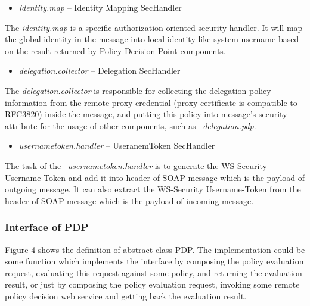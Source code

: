 \documentclass[a4paper]{article}
\newcommand\liststyleWWviiiNumxiii{%
\renewcommand\labelitemi{[F0B7?]}
\renewcommand\labelitemii{[F0B7?]}
\renewcommand\labelitemiii{[F0B7?]}
\renewcommand\labelitemiv{[F0B7?]}
}
\newcounter{Figure}
\begin{document}
\liststyleWWviiiNumxiii
\begin{itemize}
\item {\color{black}
\textit{identity.map} -- Identity Mapping SecHandler}
\end{itemize}
{\upshape\color{black}
The \textit{identity.map} is a specific authorization oriented security
handler. It will map the global identity in the message into local
identity like system username based on the result returned by Policy
Decision Point components.}

\liststyleWWviiiNumxiii
\begin{itemize}
\item {\color{black}
\textit{delegation.collector} -- Delegation SecHandler}
\end{itemize}
{\upshape\color{black}
The \textit{delegation.collector} is responsible for collecting the
delegation policy information from the remote proxy credential (proxy
certificate is compatible to RFC3820) inside the message, and putting
this policy into message{\textquoteright}s security attribute for the
usage of other components, such as \ \textit{delegation.pdp}.}

\liststyleWWviiiNumxiii
\begin{itemize}
\item {\color{black}
\textit{usernametoken.handler} -- UseranemToken SecHandler}
\end{itemize}
{\upshape\color{black}
The task of the \ \textit{usernametoken.handler} is to generate the
WS-Security Username-Token and add it into header of SOAP message which
is the payload of outgoing message. It can also extract the WS-Security
Username-Token from the header of SOAP message which is the payload of
incoming message.}

\subsubsection[Interface of PDP]{Interface of PDP}
\label{bkm:Ref204009855}{\upshape\color{black}
Figure 4 shows the definition of abstract class PDP. The implementation
could be some function which implements the interface by composing the
policy evaluation request, evaluating this request against some policy,
and returning the evaluation result, or just by composing the policy
evaluation request, invoking some remote policy decision web service
and getting back the evaluation result.}
\end{document}
